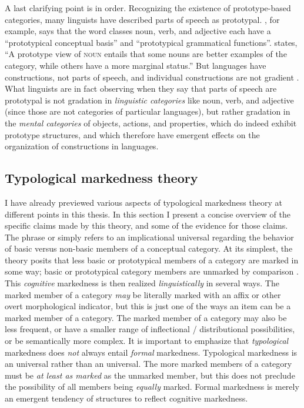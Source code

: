 A last clarifying point is in order. Recognizing the existence of prototype-based categories, many linguists have described parts of speech as prototypal. \textcite[1--2]{Dixon2004}, for example, says that the word classes noun, verb, and adjective each have a \enquote{prototypical conceptual basis} and \enquote{prototypical grammatical functions}. \textcite[217]{Taylor2003} states, \enquote{A prototype view of \textsc{noun} entails that some nouns are better examples of the category, while others have a more marginal status.} But languages have constructions, not parts of speech, and individual constructions are not gradient \parencite{Croft2007}. What linguists are in fact observing when they say that parts of speech are prototypal is not gradation in \emph{linguistic categories} like noun, verb, and adjective (since those are not categories of particular languages), but rather gradation in the \emph{mental categories} of objects, actions, and properties, which do indeed exhibit prototype structures, and which therefore have emergent effects on the organization of constructions in languages.

\subsection{Typological markedness theory}
\label{sec:2.4.2}

I have already previewed various aspects of typological markedness theory at different points in this thesis. In this section I present a concise overview of the specific claims made by this theory, and some of the evidence for those claims. The phrase  or  simply refers to an implicational universal regarding the behavior of basic versus non-basic members of a conceptual category. At its simplest, the theory posits that less basic or prototypical members of a category are marked in some way; basic or prototypical category members are unmarked by comparison \parencite{Greenberg1966}. This \emph{cognitive} markedness is then realized \emph{linguistically} in several ways. The marked member of a category \emph{may} be literally marked with an affix or other overt morphological indicator, but this is just one of the ways an item can be a marked member of a category. The marked member of a category may also be less frequent, or have a smaller range of inflectional / distributional possibilities, or be semantically more complex. It is important to emphasize that \emph{typological} markedness does \emph{not} always entail \emph{formal} markedness. Typological markedness is an  universal rather than an  universal. The more marked members of a category must be \emph{at least as marked} as the unmarked member, but this does not preclude the possibility of all members being \emph{equally} marked. Formal markedness is merely an emergent tendency of structures to reflect cognitive markedness.

